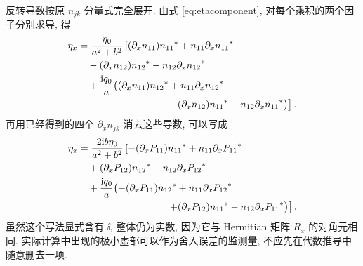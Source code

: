 \par\smallskip\noindent 反转导数按原 $n_{jk}$ 分量式完全展开.\quad
由式 \eqref{eq:etacomponent}, 对每个乘积的两个因子分别求导, 得
\begin{align*}
\eta_x
&=\dfrac{\eta_0}{a^2+b^2}\left[
(\partial_xn_{11})\conj{n_{11}}
+n_{11}\conj{\partial_xn_{11}}\right.\\
&\quad-(\partial_xn_{12})\conj{n_{12}}
-n_{12}\conj{\partial_xn_{12}}\\
&\quad+\dfrac{\ii q_0}{a}\bigl(
(\partial_xn_{11})\conj{n_{12}}
+n_{11}\conj{\partial_xn_{12}}\\
&\hspace{32mm}\left.
-(\partial_xn_{12})\conj{n_{11}}
-n_{12}\conj{\partial_xn_{11}}\bigr)\right].
\end{align*}
再用已经得到的四个 $\partial_xn_{jk}$ 消去这些导数, 可以写成
\begin{align*}
\eta_x
&=\dfrac{2\ii b\eta_0}{a^2+b^2}\left[
-(\partial_xP_{11})\conj{n_{11}}
+n_{11}\conj{\partial_xP_{11}}\right.\\
&\quad+(\partial_xP_{12})\conj{n_{12}}
-n_{12}\conj{\partial_xP_{12}}\\
&\quad+\dfrac{\ii q_0}{a}\bigl(
-(\partial_xP_{11})\conj{n_{12}}
+n_{11}\conj{\partial_xP_{12}}\\
&\hspace{32mm}\left.
+(\partial_xP_{12})\conj{n_{11}}
-n_{12}\conj{\partial_xP_{11}}\bigr)\right].
\end{align*}
虽然这个写法显式含有 $\ii$, 整体仍为实数, 因为它与 Hermitian 矩阵 $R_x$ 的对角元相同. 实际计算中出现的极小虚部可以作为舍入误差的监测量, 不应先在代数推导中随意删去一项.

